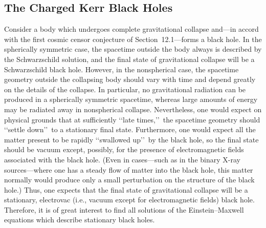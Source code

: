 
\subsection{The Charged Kerr Black Holes}\label{sec:12.3}
\setcounter{theorem}{0}

Consider a body which undergoes complete gravitational collapse and---in accord with
the first cosmic censor conjecture of Section~12.1---forms a black hole. In the
spherically symmetric case, the spacetime outside the body always is described by the
Schwarzschild solution, and the final state of gravitational collapse will be a
Schwarzschild black hole. However, in the nonspherical case, the spacetime geometry
outside the collapsing body should vary with time and depend greatly on the details of
the collapse. In particular, no gravitational radiation can be produced in a
spherically symmetric spacetime, whereas large amounts of energy may be radiated
away in nonspherical collapse. Nevertheless, one would expect on physical grounds
that at sufficiently \lq\lq late times,\rq\rq\ the spacetime geometry should
\lq\lq settle down\rq\rq\ to a stationary final state. Furthermore, one would expect
all the matter present to be rapidly \lq\lq swallowed up\rq\rq\ by the black hole, so
the final state should be vacuum except, possibly, for the presence of electromagnetic
fields associated with the black hole. (Even in cases---such as in the binary X-ray
sources---where one has a steady flow of matter into the black hole, this matter
normally would produce only a small perturbation on the structure of the black hole.)
Thus, one expects that the final state of gravitational collapse will be a stationary,
electrovac (i.e., vacuum except for electromagnetic fields) black hole. Therefore, it
is of great interest to find all solutions of the Einstein--Maxwell equations which
describe stationary black holes.

